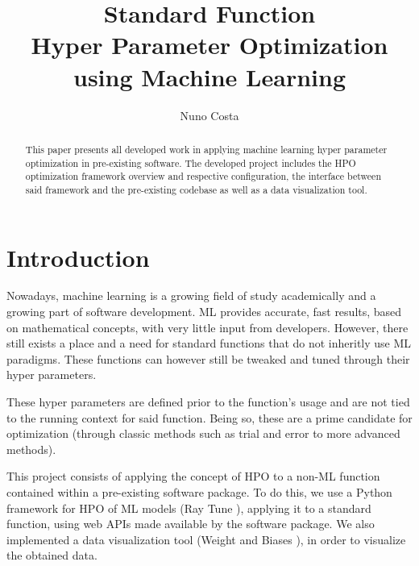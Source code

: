 \documentclass[runningheads]{llncs}
\begin{document}
\title{Standard Function\\Hyper Parameter Optimization\\using Machine Learning}

\author{Nuno Costa}


\maketitle

\begin{abstract}

This paper presents all developed work in applying machine learning hyper parameter optimization in pre-existing software. The developed project includes the HPO optimization framework overview and respective configuration, the interface between said framework and the pre-existing codebase as well as a data visualization tool. 


\end{abstract}

\section{Introduction}

Nowadays, machine learning is a growing field of study academically and a growing part of software development. ML provides accurate, fast results, based on mathematical concepts, with very little input from developers. However, there still exists a place and a need for standard functions that do not inheritly use ML paradigms. These functions can however still be tweaked and tuned through their hyper parameters.

These hyper parameters are defined prior to the function's usage and are not tied to the running context for said function. Being so, these are a prime candidate for optimization (through classic methods such as trial and error to more advanced methods).

This project consists of applying the concept of HPO to a non-ML function contained within a pre-existing software package. To do this, we use a Python framework for HPO of ML models (Ray Tune \cite{liaw2018tune}), applying it to a standard function, using web APIs made available by the software package. We also implemented a data visualization tool (Weight and Biases \cite{wandb}), in order to visualize the obtained data.
\end{document}
